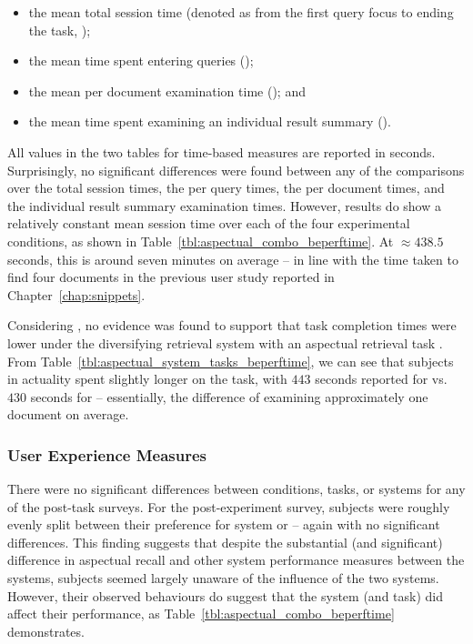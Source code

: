 \begin{itemize}
    \item{the mean total session time (denoted as from the first query focus to ending the task, );}
    \item{the mean time spent entering queries ();}
    \item{the mean per document examination time (); and}
    \item{the mean time spent examining an individual result summary ().}
\end{itemize}

All values in the two tables for time-based measures are reported in seconds. Surprisingly, no significant differences were found between any of the comparisons over the total session times, the per query times, the per document times, and the individual result summary examination times. However, results do show a relatively constant mean session time over each of the four experimental conditions, as shown in Table~\ref{tbl:aspectual_combo_beperftime}. At $\approx 438.5$ seconds, this is around seven minutes on average -- in line with the time taken to find four documents in the previous user study reported in Chapter~\ref{chap:snippets}.

Considering , no evidence was found to support that task completion times were lower under the diversifying retrieval system with an aspectual retrieval task . From Table~\ref{tbl:aspectual_system_tasks_beperftime}, we can see that subjects in actuality spent slightly longer on the task, with $443$ seconds reported for  vs. $430$ seconds for  -- essentially, the difference of examining approximately one document on average.

\subsubsection{User Experience Measures}\label{sec:diversity:users:results:experience}
There were no significant differences between conditions, tasks, or systems for any of the post-task surveys. For the post-experiment survey, subjects were roughly evenly split between their preference for system  or  -- again with no significant differences. This finding suggests that despite the substantial (and significant) difference in aspectual recall and other system performance measures between the systems, subjects seemed largely unaware of the influence of the two systems. However, their observed behaviours do suggest that the system (and task) did affect their performance, as Table~\ref{tbl:aspectual_combo_beperftime} demonstrates.

